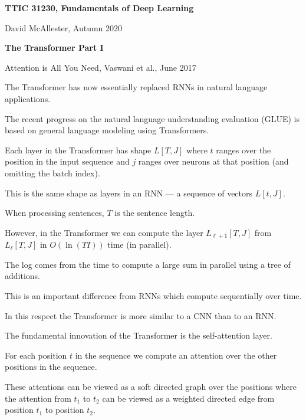 





{\Huge
  \centerline{\bf TTIC 31230,  Fundamentals of Deep Learning}
  \vfill
  \centerline{David McAllester, Autumn 2020}
  \vfill
  \centerline{\bf  The Transformer Part I}
  \vfill
  \vfill


Attention is All You Need, Vaswani et al., June 2017

\vfill
The Transformer has now essentially replaced RNNs in natural language applications.

\vfill

The recent progress on the natural language understanding evaluation (GLUE) is based on general language modeling using Transformers.


\vfill
Each layer in the Transformer has shape $L[T,J]$ where $t$ ranges over the position in the input sequence and $j$ ranges over neurons at that position
(and omitting the batch index).

\vfill
This is the same shape as layers in an RNN --- a sequence of vectors $L[t,J]$.

\vfill
When processing sentences, $T$ is the sentence length.


However, in the Transformer we can compute the layer $L_{\ell+1}[T,J]$ from $L_\ell[T,J]$ in $O(\ln(TI))$ time (in parallel).

\vfill
The log comes from the time to compute a large sum in parallel using a tree of additions.

\vfill
This is an important difference from RNNs which compute sequentially over time.

\vfill
In this respect the Transformer is more similar to a CNN than to an RNN.


The fundamental innovation of the Transformer is the self-attention layer.

\vfill
For each position $t$ in the sequence we compute an attention over the other positions in the sequence.

\vfill
These attentions can be viewed as a soft directed graph over the positions where
the attention from $t_1$ to $t_2$ can be viewed as a weighted directed edge from position $t_1$ to position $t_2$.

}
